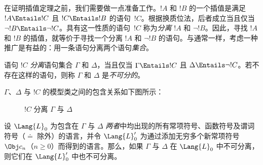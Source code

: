 \documentclass[../../../include/open-logic-section]{subfiles}
\begin{document}


在证明插值定理之前，我们需要做一点准备工作。$!A$ 和 $!B$ 的一个插值是满足 $!A \Entails !C$ 且 $!C \Entails !B$ 的语句~$!C$。根据换质位法，后者成立当且仅当 $\lnot !B \Entails \lnot !C$。具有这一性质的语句~$!C$ 称为\emph{分离} $!A$ 和 $\lnot !B$。因此，寻找 $!A$ 和 $!B$ 的插值，就等价于寻找一个分离 $!A$ 和 $\lnot !B$ 的语句。与通常一样，考虑一种推广是有益的：用一条语句分离两个语句\emph{集合}。

\begin{defn}
语句 $!C$ \emph{分离}语句集合 $\Gamma$ 和 $\Delta$，当且仅当 $\Gamma \Entails !C$ 且 $\Delta \Entails \lnot !C$。若不存在这样的语句，则称 $\Gamma$ 和 $\Delta$ 是\emph{不可分的}。
\end{defn}

$\Gamma$、$\Delta$ 与 $!C$ 的模型类之间的包含关系如下图所示：
\begin{figure}[h]
  \centering
  \caption{$!C$ 分离 $\Gamma$ 与 $\Delta$}
\end{figure}


\begin{lem}
设 $\Lang{L}_0$ 为包含在 $\Gamma$ 与 $\Delta$ \emph{两者}中均出现的所有常项符号、函数符号及谓词符号（$\doteq$ 除外）的语言，并令 $\Lang{L}'_0$ 为通过添加无穷多个新常项符号 $\Obj c_n$（$n \ge 0$）而得到的语言。那么，如果 $\Gamma$ 与 $\Delta$ 在 $\Lang{L}_0$ 中不可分离，则它们在 $\Lang{L}'_0$ 中也不可分离。
\end{lem}
\end{document}

